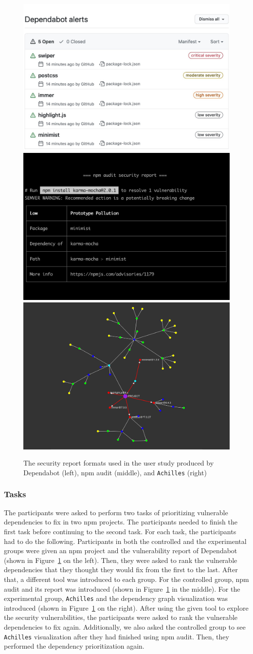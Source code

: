 \documentclass[conference]{IEEEtran}
\begin{document}
	\begin{figure}[ht!]
		\includegraphics[width=.3\textwidth]{Figures/screenshot-dependabot.jpeg}\hfill
		\includegraphics[width=.3\textwidth]{Figures/screenshot-npm-audit.png}\hfill
		\includegraphics[width=.3\textwidth]{Figures/screenshot-achilles.png}
		\caption{The security report formats used in the user study produced by Dependabot (left), npm audit (middle), and \texttt{Achilles} (right)}
		\label{fig:three-visualizations}
	\end{figure}
	
	\subsubsection{Tasks} 
	The participants were asked to perform two tasks of prioritizing vulnerable dependencies to fix in two npm projects. The participants needed to finish the first task before continuing to the second task.
	For each task, the participants had to do the following. Participants in both the controlled and the experimental groups were given an npm project and the vulnerability report of Dependabot (shown in Figure~\ref{fig:three-visualizations} on the left). Then, they were asked to rank the vulnerable dependencies that they thought they would fix from the first to the last. After that, a different tool was introduced to each group. For the controlled group, npm audit and its report was introduced (shown in Figure~\ref{fig:three-visualizations} in the middle). For the experimental group, \texttt{Achilles} and the dependency graph visualization was introduced (shown in Figure~\ref{fig:three-visualizations} on the right). After using the given tool to explore the security vulnerabilities, the participants were asked to rank the vulnerable dependencies to fix again. 
	Additionally, we also asked the controlled group to see \texttt{Achilles} visualization after they had finished using npm audit. Then, they performed the dependency prioritization again.
	
\end{document}
